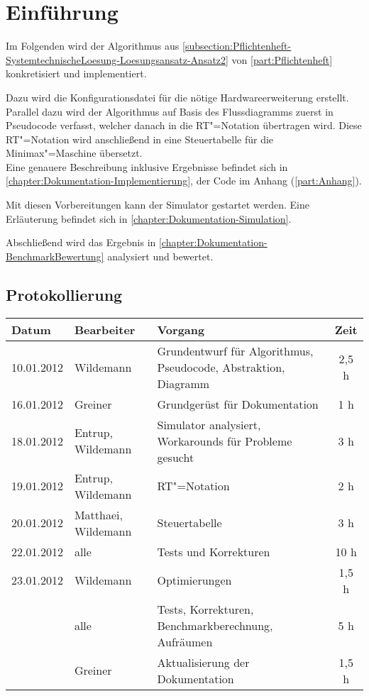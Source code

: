 \chapter{Einführung}
\label{chapter:Dokumentation-Einfuehrung}

Im Folgenden wird der Algorithmus aus \autoref{subsection:Pflichtenheft-SystemtechnischeLoesung-Loesungsansatz-Ansatz2} von \autoref{part:Pflichtenheft} konkretisiert und implementiert.

Dazu wird die Konfigurationsdatei für die nötige Hardwareerweiterung erstellt. Parallel dazu wird der Algorithmus auf Basis des Flussdiagramms zuerst in Pseudocode verfasst, welcher danach in die RT"=Notation übertragen wird. Diese RT"=Notation wird anschließend in eine Steuertabelle für die Minimax"=Maschine übersetzt.\\
Eine genauere Beschreibung inklusive Ergebnisse befindet sich in \autoref{chapter:Dokumentation-Implementierung}, der Code im Anhang (\autoref{part:Anhang}).

Mit diesen Vorbereitungen kann der Simulator gestartet werden. Eine Erläuterung befindet sich in \autoref{chapter:Dokumentation-Simulation}.

Abschließend wird das Ergebnis in \autoref{chapter:Dokumentation-BenchmarkBewertung} analysiert und bewertet.


\section{Protokollierung}
\label{section:Dokumentation-Einfuehrung-Protokollierung}

\begin{tabularx}{\textwidth}{|l|l|X|c|}
    \hline
    Datum & Bearbeiter & Vorgang & Zeit \\
    \hline
    \hline
    10.01.2012 & Wildemann & Grundentwurf für Algorithmus, Pseudocode, Abstraktion, Diagramm & 2,5 h \\
    \hline
    16.01.2012 & Greiner & Grundgerüst für Dokumentation & 1 h \\
    \hline
    18.01.2012 & Entrup, Wildemann & Simulator analysiert, Workarounds für Probleme gesucht & 3 h \\
    \hline
    19.01.2012 & Entrup, Wildemann & RT"=Notation & 2 h\\
    \hline
    20.01.2012 & Matthaei, Wildemann & Steuertabelle & 3 h\\
    \hline
    22.01.2012 & alle & Tests und Korrekturen & 10 h\\
    \hline
    23.01.2012 & Wildemann & Optimierungen & 1,5 h \\
               & alle & Tests, Korrekturen, Benchmarkberechnung, Aufräumen & 5 h \\
               & Greiner & Aktualisierung der Dokumentation & 1,5 h \\
    \hline
\end{tabularx}
